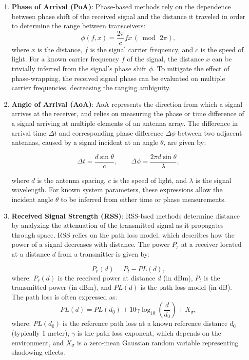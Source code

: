 \begin{enumerate}
    \item \textbf{Phase of Arrival (PoA)}: Phase-based methods rely on the dependence between phase shift of the received signal and the distance it traveled in order to determine the range between transceivers:
    \begin{equation}
        \phi(f, x) = \frac{2\pi}{c}fx\,(\bmod\,2\pi),
    \end{equation}
    where $x$ is the distance, $f$ is the signal carrier frequency, and $c$ is the speed of light. For a known carrier frequency $f$ of the signal, the distance $x$ can be trivially inferred from the signal's phase shift $\phi$. To mitigate the effect of phase-wrapping, the received signal phase can be evaluated on multiple carrier frequencies, decreasing the ranging ambiguity. 
    
    \item \textbf{Angle of Arrival (AoA)}: AoA represents the direction from which a signal arrives at the receiver, and relies on measuring the phase or time difference of a signal arriving at multiple elements of an antenna array. The difference in arrival time $\Delta t$ and corresponding phase difference $\Delta \phi$ between two adjacent antennas, caused by a signal incident at an angle $\theta$, are given by:
    
    \begin{equation} 
    \Delta t = \frac{d \sin \theta}{c}, \qquad \Delta \phi = \frac{2\pi d \sin \theta}{\lambda}, 
    \end{equation}
    
    where $d$ is the antenna spacing, $c$ is the speed of light, and $\lambda$ is the signal wavelength. For known system parameters, these expressions allow the incident angle $\theta$ to be inferred from either time or phase measurements.
    
    \item \textbf{Received Signal Strength (RSS)}: RSS-bsed methods determine distance by analyzing the attenuation of the transmitted signal as it propagates through space. RSS relies on the path loss model, which describes how the power of a  signal decreases with distance. The power $P_r$ at a receiver located at a distance $d$ from a transmitter is given by:
    
    \begin{equation}
    P_r(d) = P_t - PL(d),
    \end{equation}
    where: $P_r(d)$ is the received power at distance $d$ (in dBm), $P_t$ is the transmitted power (in dBm), and $PL(d)$ is the path loss model (in dB). The path loss is often expressed as:
    \begin{equation}
    PL(d) = PL(d_0) + 10 \gamma \log_{10} \left( \frac{d}{d_0} \right) + X_{\sigma},
    \end{equation}
    where: $PL(d_0)$ is the reference path loss at a known reference distance $d_0$ (typically 1 meter), $\gamma$ is the path loss exponent, which depends on the environment, and $X_{\sigma}$ is a zero-mean Gaussian random variable representing shadowing effects.
    

\end{enumerate}

